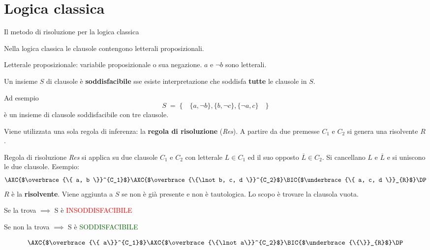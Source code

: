 \documentclass{beamer}
\begin{document}
\section{Logica classica}
\begin{frame}{Il metodo di risoluzione per la logica classica}

    Nella logica classica le clausole contengono letterali proposizionali.

    Letterale proposizionale: variabile proposizionale o sua negazione. $a$ e $\lnot b$ sono letterali.

    Un insieme $S$ di clausole è \textbf{soddisfacibile} sse esiste interpretazione che soddisfa \textbf{tutte} le clausole in $S$.

    \vspace{5px}

    Ad esempio 
    \[S \; = \; \{ \quad \{a, \lnot b\}, \{b, \lnot c\}, \{\lnot a, c\} \quad \}\]
    è un insieme di clausole soddisfacibile con tre clausole.
    
    \vspace{10px}

    Viene utilizzata una sola regola di inferenza: la \textbf{regola di risoluzione} (\emph{Res}). A partire da due premesse $C_1$ e $C_2$ si genera una risolvente $R$.
\end{frame}

\begin{frame}{Regola di risoluzione}
    \emph{Res} si applica su due clausole $C_1$ e $C_2$ con letterale $L \in C_1$ ed il suo opposto $\overline{L} \in C_2$. Si cancellano $L$ e $\overline{L}$ e si uniscono le due clausole.
    Esempio:
    \[
        \AXC{$\overbrace{\{ a, b \}}^{C_1}$}
        \AXC{$\overbrace{\{\lnot b, c, d \}}^{C_2}$}
        \RightLabel{Res}
        \BIC{$\underbrace{\{ a, c, d \}}_{R}$}
        \DP
    \]
    $R$ è la \textbf{risolvente}. Viene aggiunta a $S$ se non è già presente e non è tautologica. Lo scopo è trovare la clausola vuota.
    \begin{center}
        \begin{minipage}{0.45\textwidth}
            Se la trova $\implies$ S è \textcolor{red}{INSODDISFACIBILE}
            
            Se non la trova $\implies$ S è \textcolor{darkgreen}{SODDISFACIBILE}
        \end{minipage}
        \hspace{0.05\textwidth}
        \begin{minipage}{0.45\textwidth}
            \small
            \[
                \AXC{$\overbrace{\{ a\}}^{C_1}$}
                \AXC{$\overbrace{\{\lnot a\}}^{C_2}$}
                \RightLabel{Res}
                \BIC{$\underbrace{\{\}}_{R}$}
                \DP
            \]
        \end{minipage}
    \end{center}
\end{frame}
\end{document}
